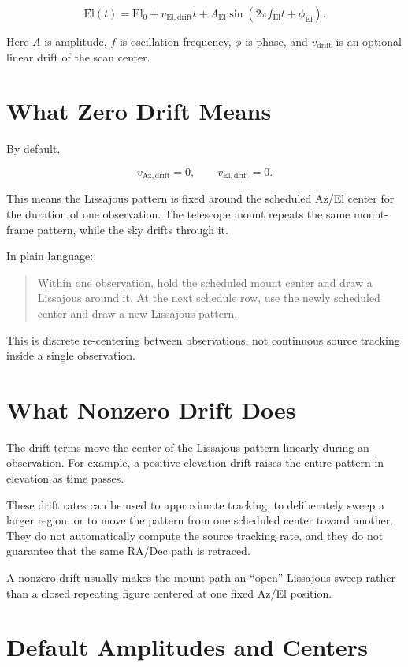 \documentclass[11pt]{article}
\begin{document}
\[
    \mathrm{El}(t) =
    \mathrm{El}_{0}
    + v_{\mathrm{El,drift}} t
    + A_{\mathrm{El}}
      \sin \left(2\pi f_{\mathrm{El}} t + \phi_{\mathrm{El}}\right).
\]

Here \(A\) is amplitude, \(f\) is oscillation frequency, \(\phi\) is phase, and
\(v_{\mathrm{drift}}\) is an optional linear drift of the scan center.

\section*{What Zero Drift Means}

By default,

\[
    v_{\mathrm{Az,drift}} = 0,
    \qquad
    v_{\mathrm{El,drift}} = 0.
\]

This means the Lissajous pattern is fixed around the scheduled Az/El center
for the duration of one observation.  The telescope mount repeats the same
mount-frame pattern, while the sky drifts through it.

In plain language:

\begin{quote}
Within one observation, hold the scheduled mount center and draw a Lissajous
around it.  At the next schedule row, use the newly scheduled center and draw a
new Lissajous pattern.
\end{quote}

This is discrete re-centering between observations, not continuous source
tracking inside a single observation.

\section*{What Nonzero Drift Does}

The drift terms move the center of the Lissajous pattern linearly during an
observation.  For example, a positive elevation drift raises the entire pattern
in elevation as time passes.

These drift rates can be used to approximate tracking, to deliberately sweep a
larger region, or to move the pattern from one scheduled center toward another.
They do not automatically compute the source tracking rate, and they do not
guarantee that the same RA/Dec path is retraced.

A nonzero drift usually makes the mount path an ``open'' Lissajous sweep rather
than a closed repeating figure centered at one fixed Az/El position.

\section*{Default Amplitudes and Centers}
\end{document}
